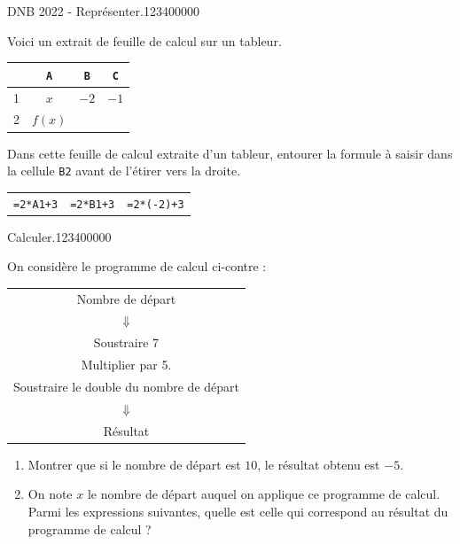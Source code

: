 \begin{pageParcoursd}
\begin{ExoCd}{DNB 2022 - Représenter.}{1234}{0}{0}{0}{0}{0}
\begin{minipage}{0.3\linewidth}
Voici un extrait de feuille de calcul sur un tableur.

\begin{tabular}{|c|c|c|c|}
\hline 
  & \texttt{A} & \texttt{B} & \texttt{C} \\ 
\hline 
1 & $x$ & $-2$ & $-1$ \\ 
\hline 
2 & $f(x)$ &   &   \\ 
\hline 
\end{tabular} 
\end{minipage}
\hfill
\begin{minipage}{0.65\linewidth}
Dans cette feuille de calcul extraite d’un tableur, entourer la formule à saisir dans la cellule \texttt{B2} avant de l'étirer vers la droite.

\begin{tabular}{ c c c }
\texttt{=2*A1+3} & \texttt{=2*B1+3} &  \texttt{=2*(-2)+3}  \\ 
\end{tabular}
\end{minipage}
\end{ExoCd}
 

 
 
 
 
 \begin{ExoCd}{Calculer.}{1234}{0}{0}{0}{0}{0}

\begin{minipage}{0.5\linewidth}
On considère le programme de calcul ci-contre :
\end{minipage}
\begin{minipage}{0.5\linewidth}

\begin{tabular}{c}
 
Nombre de départ \\ 
 $\Downarrow$ \\ 
Soustraire 7 \\ 
Multiplier par 5. \\ 
Soustraire le double du nombre de départ\\  
$\Downarrow$ \\ 
Résultat\\ 
 
\end{tabular} 


\end{minipage}

\begin{enumerate}
\item Montrer que si le nombre de départ est $10$, le résultat obtenu est $-5$. 
\item On note $x$ le nombre de départ auquel on applique ce programme de calcul. 
Parmi les expressions suivantes, quelle est celle qui correspond au résultat du programme de calcul ? 



\end{enumerate}
\end{ExoCd}
\end{pageParcoursd}
